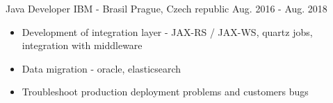 \begin{cventries}
  \cventry
    {Java Developer} %
    {IBM -  Brasil} %
    {Prague,  Czech republic} %
    {Aug. 2016 - Aug. 2018} %
    {
        \hspace{15pt} 
        \begin{itemize}
            \item {Development of integration layer - JAX-RS / JAX-WS, quartz jobs, integration with middleware}
            \item {Data migration - oracle, elasticsearch}
            \item {Troubleshoot production deployment problems and customers bugs}
        \end{itemize}
    }
\end{cventries}
